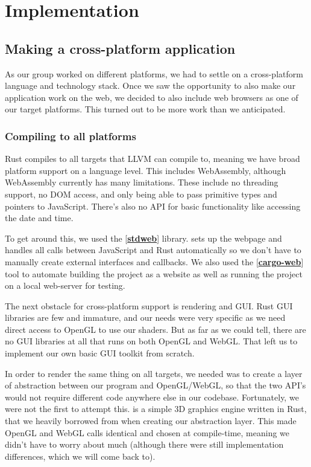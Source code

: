 \documentclass{article}
\newcommand{\code}[1]{\fcolorbox{codebd}{codebg}{\lstinline[basicstyle=\ttfamily\color{codefg}]{#1}}}
\newcommand{\reference}[1]{[\hyperref[ref:#1]{\textbf{#1}}]}
\begin{document}
\section*{Implementation}

\subsection*{Making a cross-platform application}

As our group worked on different platforms, we had to settle on a cross-platform language and technology stack. Once we saw the opportunity to also make our application work on the web, we decided to also include web browsers as one of our target platforms. This turned out to be more work than we anticipated.

\subsubsection*{Compiling to all platforms}

Rust compiles to all targets that LLVM can compile to, meaning we have broad platform support on a language level. This includes WebAssembly, although WebAssembly currently has many limitations. These include no threading support, no DOM access, and only being able to pass primitive types and pointers to JavaScript. There's also no API for basic functionality like accessing the date and time.

To get around this, we used the \reference{stdweb} library. \code{stdweb} sets up the webpage and handles all calls between JavaScript and Rust automatically so we don't have to manually create external interfaces and callbacks. We also used the \reference{cargo-web} tool to automate building the project as a website as well as running the project on a local web-server for testing.

The next obstacle for cross-platform support is rendering and GUI\@. Rust GUI libraries are few and immature, and our needs were very specific as we need direct access to OpenGL to use our shaders. But as far as we could tell, there are no GUI libraries at all that runs on both OpenGL and WebGL\@. That left us to implement our own basic GUI toolkit from scratch.

In order to render the same thing on all targets, we needed was to create a layer of abstraction between our program and OpenGL/WebGL, so that the two API's would not require different code anywhere else in our codebase. Fortunately, we were not the first to attempt this. \code{Kiss3D} is a simple 3D graphics engine written in Rust, that we heavily borrowed from when creating our abstraction layer. This made OpenGL and WebGL calls identical and chosen at compile-time, meaning we didn't have to worry about much (although there were still implementation differences, which we will come back to).
\end{document}
